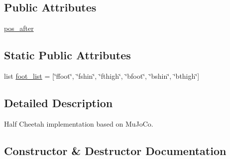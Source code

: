 \subsection*{Public Attributes}
\begin{DoxyCompactItemize}
\item 
\hyperlink{classpybullet-gym_1_1pybulletgym_1_1envs_1_1mujoco_1_1robots_1_1locomotors_1_1half__cheetah_1_1_half_cheetah_a6df842c284d7b020e1847175aa46ff17}{pos\+\_\+after}
\end{DoxyCompactItemize}
\subsection*{Static Public Attributes}
\begin{DoxyCompactItemize}
\item 
list \hyperlink{classpybullet-gym_1_1pybulletgym_1_1envs_1_1mujoco_1_1robots_1_1locomotors_1_1half__cheetah_1_1_half_cheetah_aee727a392b1336c33a82df87c26315d0}{foot\+\_\+list} = \mbox{[}\char`\"{}ffoot\char`\"{}, \char`\"{}fshin\char`\"{}, \char`\"{}fthigh\char`\"{}, \char`\"{}bfoot\char`\"{}, \char`\"{}bshin\char`\"{}, \char`\"{}bthigh\char`\"{}\mbox{]}
\end{DoxyCompactItemize}


\subsection{Detailed Description}
\begin{DoxyVerb}Half Cheetah implementation based on MuJoCo.
\end{DoxyVerb}
 

\subsection{Constructor \& Destructor Documentation}
